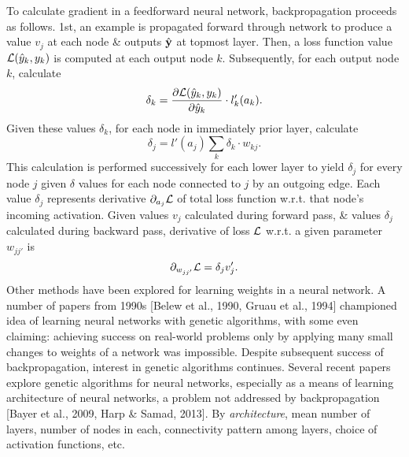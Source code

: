 \documentclass{article}
\begin{document}
\begin{enumerate}
\begin{itemize}
\begin{itemize}
			To calculate gradient in a feedforward neural network, backpropagation proceeds as follows. 1st, an example is propagated forward through network to produce a value $v_j$ at each node \& outputs $\hat{\bf y}$ at topmost layer. Then, a loss function value ${\cal L}(\hat{y}_k,y_k)$ is computed at each output node $k$. Subsequently, for each output node $k$, calculate
			\begin{equation}
				\delta_k = \frac{\partial{\cal L}(\hat{y}_k,y_k)}{\partial\hat{y}_k}\cdot l_k'(a_k).
			\end{equation}
			Given these values $\delta_k$, for each node in immediately prior layer, calculate
			\begin{equation}
				\delta_j = l'(a_j)\sum_k \delta_k\cdot w_{kj}.
			\end{equation}
			This calculation is performed successively for each lower layer to yield $\delta_j$ for every node $j$ given $\delta$ values for each node connected to $j$ by an outgoing edge. Each value $\delta_j$ represents derivative $\partial_{a_j}{\cal L}$ of total loss function w.r.t. that node's incoming activation. Given values $v_j$ calculated during forward pass, \& values $\delta_j$ calculated during backward pass, derivative of loss ${\cal L}$ w.r.t. a given parameter $w_{jj'}$ is
			\begin{equation}
				\partial_{w_{jj'}}{\cal L} = \delta_jv_j'.
			\end{equation}
			Other methods have been explored for learning weights in a neural network. A number of papers from 1990s [Belew et al., 1990, Gruau et al., 1994] championed idea of learning neural networks with genetic algorithms, with some even claiming: achieving success on real-world problems only by applying many small changes to weights of a network was impossible. Despite subsequent success of backpropagation, interest in genetic algorithms continues. Several recent papers explore genetic algorithms for neural networks, especially as a means of learning architecture of neural networks, a problem not addressed by backpropagation [Bayer et al., 2009, Harp \& Samad, 2013]. By {\it architecture}, mean number of layers, number of nodes in each, connectivity pattern among layers, choice of activation functions, etc.
			

\end{itemize}
\end{itemize}
\end{enumerate}
\end{document}
